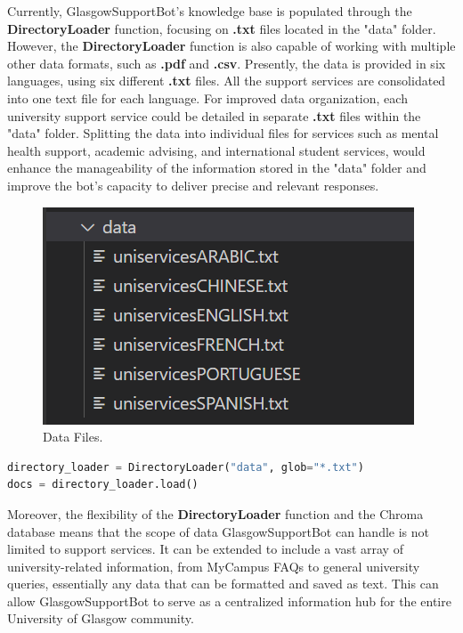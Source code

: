 \documentclass{l4proj}
\begin{document}
Currently, GlasgowSupportBot's knowledge base is populated through the \textbf{DirectoryLoader} function, focusing on \textbf{.txt} files located in the "data" folder. However, the \textbf{DirectoryLoader} function is also capable of working with multiple other data formats, such as \textbf{.pdf} and \textbf{.csv}. Presently, the data is provided in six languages, using six different \textbf{.txt} files. All the support services are consolidated into one text file for each language. For improved data organization, each university support service could be detailed in separate \textbf{.txt} files within the "data" folder. Splitting the data into individual files for services such as mental health support, academic advising, and international student services, would enhance the manageability of the information stored in the "data" folder and improve the bot's capacity to deliver precise and relevant responses.

\begin{figure}[!h]
  \centering
  \begin{adjustbox}{center,max height=0.28\textheight, max width=\linewidth}
    \includegraphics{images/datafolder.png}
  \end{adjustbox}
  \caption{Data Files.}
  \label{fig:Data Files.}
\end{figure}

\begin{lstlisting}[language=Python, caption={DirectoryLoader}]
directory_loader = DirectoryLoader("data", glob="*.txt") 
docs = directory_loader.load()
\end{lstlisting}

Moreover, the flexibility of the \textbf{DirectoryLoader} function and the Chroma database means that the scope of data GlasgowSupportBot can handle is not limited to support services. It can be extended to include a vast array of university-related information, from MyCampus FAQs to general university queries, essentially any data that can be formatted and saved as text. This can allow GlasgowSupportBot to serve as a centralized information hub for the entire University of Glasgow community.
\end{document}
